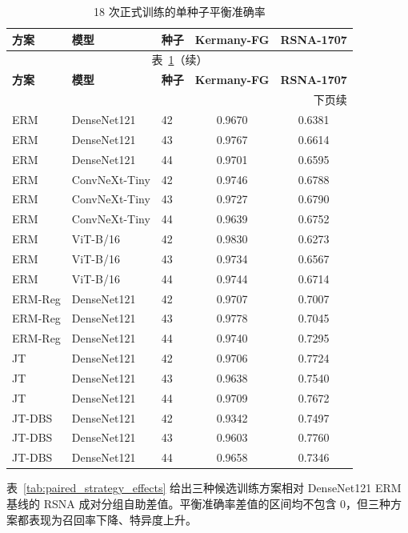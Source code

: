 \documentclass[12pt,a4paper,UTF8,openany]{ctexbook}
\begin{document}
\begin{longtable}{lllcc}
\caption{18 次正式训练的单种子平衡准确率}\label{tab:all_runs_balacc}\\
\toprule
\textbf{方案} & \textbf{模型} & \textbf{种子} & \textbf{Kermany-FG} & \textbf{RSNA-1707} \\
\midrule
\endfirsthead
\multicolumn{5}{c}{\small 表~\ref{tab:all_runs_balacc}（续）}\\
\toprule
\textbf{方案} & \textbf{模型} & \textbf{种子} & \textbf{Kermany-FG} & \textbf{RSNA-1707} \\
\midrule
\endhead
\midrule
\multicolumn{5}{r}{\small 下页续}\\
\endfoot
\bottomrule
\endlastfoot
ERM & DenseNet121 & 42 & 0.9670 & 0.6381 \\
ERM & DenseNet121 & 43 & 0.9767 & 0.6614 \\
ERM & DenseNet121 & 44 & 0.9701 & 0.6595 \\
ERM & ConvNeXt-Tiny & 42 & 0.9746 & 0.6788 \\
ERM & ConvNeXt-Tiny & 43 & 0.9727 & 0.6790 \\
ERM & ConvNeXt-Tiny & 44 & 0.9639 & 0.6752 \\
ERM & ViT-B/16 & 42 & 0.9830 & 0.6273 \\
ERM & ViT-B/16 & 43 & 0.9734 & 0.6567 \\
ERM & ViT-B/16 & 44 & 0.9744 & 0.6714 \\
ERM-Reg & DenseNet121 & 42 & 0.9707 & 0.7007 \\
ERM-Reg & DenseNet121 & 43 & 0.9778 & 0.7045 \\
ERM-Reg & DenseNet121 & 44 & 0.9740 & 0.7295 \\
JT & DenseNet121 & 42 & 0.9706 & 0.7724 \\
JT & DenseNet121 & 43 & 0.9638 & 0.7540 \\
JT & DenseNet121 & 44 & 0.9709 & 0.7672 \\
JT-DBS & DenseNet121 & 42 & 0.9342 & 0.7497 \\
JT-DBS & DenseNet121 & 43 & 0.9603 & 0.7760 \\
JT-DBS & DenseNet121 & 44 & 0.9658 & 0.7346 \\
\end{longtable}

表~\ref{tab:paired_strategy_effects} 给出三种候选训练方案相对 DenseNet121 ERM 基线的 RSNA 成对分组自助差值。平衡准确率差值的区间均不包含 0，但三种方案都表现为召回率下降、特异度上升。
\end{document}
